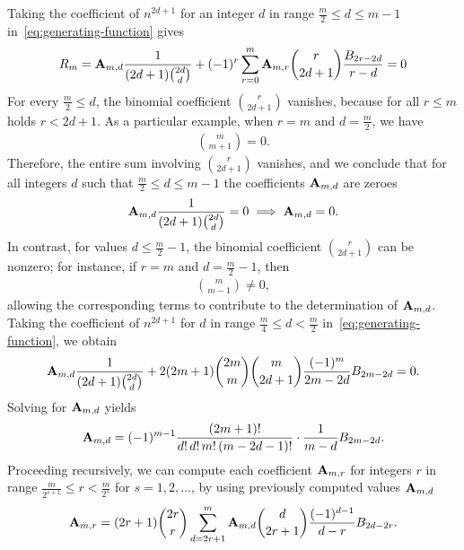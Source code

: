 Taking the coefficient of $n^{2d+1}$ for an integer $d$ in range $\frac{m}{2} \leq d \leq m-1$ in~\eqref{eq:generating-function} gives
\begin{align*}
[n^{2d+1}]
    R_m
    = \coeffA{m}{d} \frac{1}{(2d+1) \binom{2d}{d}}
    + (-1)^r \sum_{r=0}^m \coeffA{m}{r} \binom{r}{2d+1} \frac{\bernoulli{2r-2d} }{r-d}
    = 0
\end{align*}
For every $\frac{m}{2} \leq d$, the binomial coefficient $\binom{r}{2d+1}$ vanishes, because for all $r \leq m$
holds $r < 2d+1$.
As a particular example, when $r = m$ and $d = \frac{m}{2}$, we have
\begin{align*}
    \binom{m}{m+1} = 0.
\end{align*}
Therefore, the entire sum involving $\binom{r}{2d+1}$ vanishes, and we conclude
that for all integers $d$ such that $\frac{m}{2} \leq d \leq m-1$ the coefficients ${\mathbf{A}} \sb{m,d}$
are zeroes
\begin{align*}
    {\mathbf{A}} \sb{m,d} \frac{1}{(2d+1) \binom{2d}{d}} = 0 \implies {\mathbf{A}} \sb{m,d} = 0.
\end{align*}
In contrast, for values $d \leq \frac{m}{2} - 1$, the binomial coefficient $\binom{r}{2d+1}$ can be nonzero; for instance, if $r = m$ and $d = \frac{m}{2} - 1$, then
\begin{align*}
    \binom{m}{m - 1} \neq 0,
\end{align*}
allowing the corresponding terms to contribute to the determination of ${\mathbf{A}} \sb{m,d}$.
Taking the coefficient of $n^{2d+1}$ for $d$ in range $\frac{m}{4} \leq d < \frac{m}{2}$ in~\eqref{eq:generating-function}, we obtain
\begin{align*}
    {\mathbf{A}} \sb{m,d} \frac{1}{(2d+1) \binom{2d}{d}}
    + 2 (2m+1) \binom{2m}{m} \binom{m}{2d+1} \frac{(-1)^m}{2m - 2d} {B}\sb{2m - 2d} = 0.
\end{align*}
Solving for ${\mathbf{A}} \sb{m,d}$ yields
\begin{equation*}
    {\mathbf{A}} \sb{m,d}
    = (-1)^{m-1} \frac{(2m+1)!}{d! \, d! \, m! \, (m - 2d - 1)!} \cdot \frac{1}{m - d} {B}\sb{2m - 2d}.
\end{equation*}
Proceeding recursively, we can compute each coefficient ${\mathbf{A}} \sb{m,r}$ for integers $r$ in range
$\frac{m}{2^{s+1}} \leq r < \frac{m}{2^s}$ for $s = 1, 2, \ldots$,
by using previously computed values ${\mathbf{A}} \sb{m,d}$
\begin{equation*}
    {\mathbf{A}} \sb{m,r} =
    (2r+1) \binom{2r}{r} \sum_{d = 2r+1}^{m}
    {\mathbf{A}} \sb{m,d} \binom{d}{2r+1} \frac{(-1)^{d-1}}{d - r} {B}\sb{2d - 2r}.
\end{equation*}
